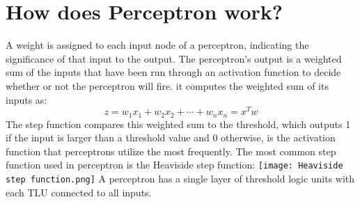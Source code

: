 \section{How does Perceptron work?}
    A weight is assigned to each input node of a perceptron, indicating the significance of that input to the output. The perceptron’s output is a weighted sum of the inputs that have been run through an activation function to decide whether or not the perceptron will fire. it computes the weighted sum of its inputs as:
    \[z = w_{1}x_{1} + w_{2}x_{2} + \cdots + w_{n}x_{n} = x^Tw\]
    The step function compares this weighted sum to the threshold, which outputs 1 if the input is larger than a threshold value and 0 otherwise, is the activation function that perceptrons utilize the most frequently. The most common step function used in perceptron is the Heaviside step function:
    \texttt{[image: Heaviside step function.png]}
    A perceptron has a single layer of threshold logic units with each TLU connected to all inputs. 

